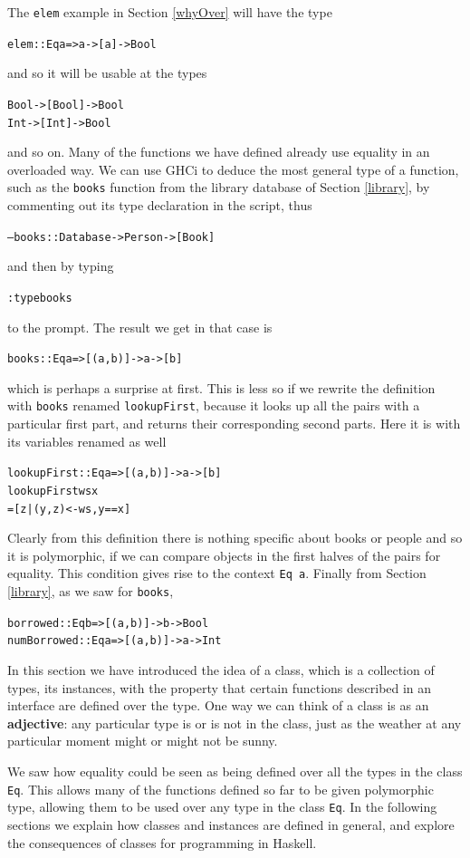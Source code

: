 The \texttt{elem} example in Section \ref{whyOver} will have the type
\begin{alltt}
elem :: Eq a => a -> [a] -> Bool
\end{alltt}
and so it will be usable at the types
\begin{alltt}
Bool -> [Bool] -> Bool
Int  -> [Int]  -> Bool
\end{alltt}
and so on. Many of the functions we have defined already use equality in an
overloaded way. We can
use GHCi to deduce the most general type of a function, such as
the
\texttt{books} function from the library database of Section \ref{library},
by commenting out its type declaration in the script, thus
\begin{alltt}
-- books :: Database -> Person -> [Book]
\end{alltt}
and then by typing
\begin{alltt}
:type books
\end{alltt}
to the prompt. The result we get in that case is
\begin{alltt}
books :: Eq a => [ (a,b) ] -> a -> [b]
\end{alltt}
which is perhaps a surprise at first. This is less so if we rewrite the
definition with \texttt{books} renamed \texttt{lookupFirst},
because it looks up all the pairs with a particular first part, and returns
their corresponding second parts. Here it is with its variables renamed
as well
\begin{alltt}
lookupFirst :: Eq a => [ (a,b) ] -> a -> [b]
\bl
lookupFirst ws x 
  = [ z | (y,z) <- ws , y==x ]
\end{alltt}
Clearly from this definition there is nothing specific about books or
people
and so it is polymorphic, if we can compare objects in the first halves of the
pairs for equality. This condition gives rise to the context \texttt{Eq a}.
Finally from Section \ref{library}, as we saw for \texttt{books},
\begin{alltt}
borrowed    :: Eq b => [ (a,b) ] -> b -> Bool
numBorrowed :: Eq a => [ (a,b) ] -> a -> Int
\end{alltt}

\begin{summary}
In this section we have introduced the idea of a class, which is a collection
of types, its instances, with the property that certain functions described in an interface are
defined over the type. One way we can think of a class is as an \textbf{adjective}: 
any particular type is or is not in the class, just as the 
weather at any particular moment might or might not be sunny.

We saw how equality could be seen as being defined over all the types in the
class \texttt{Eq}. This allows many of the functions defined so
far to be given polymorphic type, allowing them to be used over any type in
the class \texttt{Eq}. In the following sections we explain how classes and
instances are defined in general, and explore the consequences of classes for
programming in Haskell.
\end{summary}

